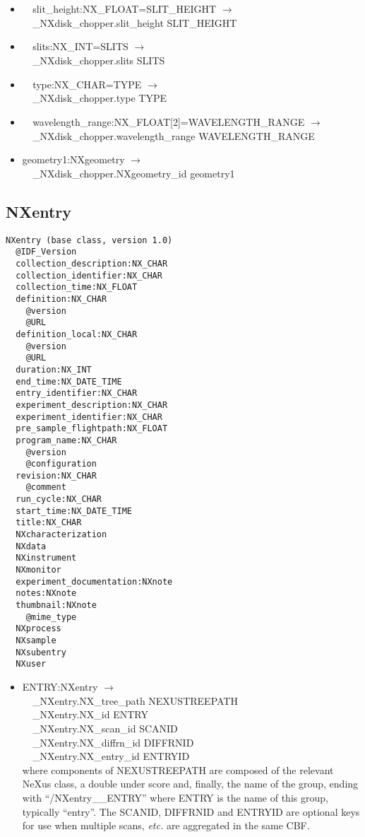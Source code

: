 \documentclass[11pt]{article}
\begin{document}
{{\begin{itemize}
\item{\verb|  |slit\_height:NX\_FLOAT=SLIT\_HEIGHT $\rightarrow$\\
\verb|  |\_NXdisk\_chopper.slit\_height SLIT\_HEIGHT}

\item{\verb|  |slits:NX\_INT=SLITS $\rightarrow$\\
\verb|  |\_NXdisk\_chopper.slits SLITS}

\item{\verb|  |type:NX\_CHAR=TYPE $\rightarrow$\\
\verb|  |\_NXdisk\_chopper.type TYPE}

\item{\verb|  |wavelength\_range:NX\_FLOAT[2]=WAVELENGTH\_RANGE $\rightarrow$\\
\verb|  |\_NXdisk\_chopper.wavelength\_range WAVELENGTH\_RANGE}

\item{geometry1:NXgeometry $\rightarrow$\\
\verb|  |\_NXdisk\_chopper.NXgeometry\_id geometry1}
\end{itemize}
\subsection{NXentry}

\begin{verbatim}
NXentry (base class, version 1.0)
  @IDF_Version
  collection_description:NX_CHAR
  collection_identifier:NX_CHAR
  collection_time:NX_FLOAT
  definition:NX_CHAR
    @version
    @URL
  definition_local:NX_CHAR
    @version
    @URL
  duration:NX_INT
  end_time:NX_DATE_TIME
  entry_identifier:NX_CHAR
  experiment_description:NX_CHAR
  experiment_identifier:NX_CHAR
  pre_sample_flightpath:NX_FLOAT
  program_name:NX_CHAR
    @version
    @configuration
  revision:NX_CHAR
    @comment
  run_cycle:NX_CHAR
  start_time:NX_DATE_TIME
  title:NX_CHAR
  NXcharacterization
  NXdata
  NXinstrument
  NXmonitor
  experiment_documentation:NXnote
  notes:NXnote
  thumbnail:NXnote
    @mime_type
  NXprocess
  NXsample
  NXsubentry
  NXuser
\end{verbatim}

\begin{itemize}

\item{ENTRY:NXentry $\rightarrow$\\
\verb|  |\_NXentry.NX\_tree\_path    NEXUSTREEPATH \\
\verb|  |\_NXentry.NX\_id            ENTRY\\
\verb|  |\_NXentry.NX\_scan\_id      SCANID \\
\verb|  |\_NXentry.NX\_diffrn\_id    DIFFRNID \\
\verb|  |\_NXentry.NX\_entry\_id     ENTRYID \\
where components of NEXUSTREEPATH are composed of the
relevant NeXus class, a double under score and, finally, the
name of the group, ending with ``/NXentry\_\_ENTRY''
where ENTRY is the name of this group, typically ``entry''.
The SCANID, DIFFRNID and ENTRYID are optional keys for use
when multiple scans, {\it etc.} are aggregated in the same CBF.}


\end{itemize}}}
\end{document}

